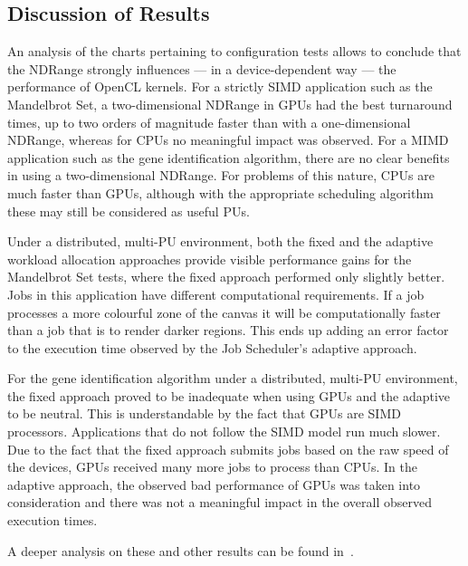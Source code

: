 \documentclass[runningheads,a4paper]{llncs}
\begin{document}

\subsection{Discussion of Results}
\label{sub:discussion}

An analysis of the charts pertaining to configuration tests allows to conclude that the NDRange strongly influences --- in a device-dependent way --- the performance of OpenCL kernels. For a strictly SIMD application such as the Mandelbrot Set, a two-dimensional NDRange in GPUs had the best turnaround times, up to two orders of magnitude faster than with a one-dimensional NDRange, whereas for CPUs no meaningful impact was observed. For a MIMD application such as the gene identification algorithm, there are no clear benefits in using a two-dimensional NDRange. For problems of this nature, CPUs are much faster than GPUs, although with the appropriate scheduling algorithm these may still be considered as useful PUs.

Under a distributed, multi-PU environment, both the fixed and the adaptive workload allocation approaches provide visible performance gains for the Mandelbrot Set tests, where the fixed approach performed only slightly better. Jobs in this application have different computational requirements. If a job processes a more colourful zone of the canvas it will be computationally faster than a job that is to render darker regions. This ends up adding an error factor to the execution time observed by the Job Scheduler's adaptive approach.

For the gene identification algorithm under a distributed, multi-PU environment, the fixed approach proved to be inadequate when using GPUs and the adaptive to be neutral. This is understandable by the fact that GPUs are SIMD processors. Applications that do not follow the SIMD model run much slower. Due to the fact that the fixed approach submits jobs based on the raw speed of the devices, GPUs received many more jobs to process than CPUs. In the adaptive approach, the observed bad performance of GPUs was taken into consideration and there was not a meaningful impact in the overall observed execution times.


A deeper analysis on these and other results can be found in~\cite{LuisOliveira:MSc:2011}.
\end{document}
